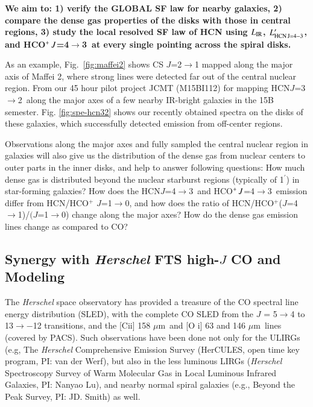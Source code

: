 \documentclass[legal,11pt]{article}
\def\arcmin {\hbox{$^{\prime}$}}
\def\,{\thinspace}
\def\to{$\rightarrow$}
\def\mum{$\mu$m}
\def\LIR     {$L_{\rm IR}$}
\def\LHCNft  {$L'_{\rm HCN\, J=4-3}$}
\def\HCNft        {HCN\,$J$=4$\rightarrow$3}
\def\HCNtt        {HCN\,$J$=3$\rightarrow$2}
\def\HCOPft     {HCO$^+\,J$=4$\rightarrow$3}
\begin{document}
{\bf We aim to: 1) verify the GLOBAL SF law for nearby galaxies, 2) compare the
dense gas properties of the disks with those in central regions, 3) study the
local resolved SF law of HCN using \LIR, \LHCNft, and \HCOPft\  at every single
pointing across the spiral disks.} 


As an example, Fig.~\ref{fig:maffei2} shows CS $J$=2$\rightarrow$1 mapped along
the major axis of Maffei 2, where strong lines were detected far out of the
central nuclear region. From our 45 hour pilot project JCMT (M15BI112) for
mapping \HCNtt\ along the major axes of a few nearby IR-bright galaxies in the
15B semester. Fig. \ref{fig:spe-hcn32} shows our recently obtained spectra on
the disks of these galaxies, which successfully detected emission from
off-center regions.  


Observations along the major axes and fully sampled the central nuclear region
in galaxies will also give us the distribution of the dense gas from nuclear
centers to outer parts in the inner disks, and help to answer following
questions: How much dense gas is distributed beyond the nuclear starburst
regions (typically of 1\arcmin) in star-forming galaxies?  How does the \HCNft\
and \HCOPft\ emission differ from HCN/HCO$^+$ $J$=1\to0, and how does the ratio
of HCN/HCO$^+$($J$=4\to 1)/$(J$=1\to 0) change along the major axes? How do the
dense gas emission lines change as compared to CO?


\subsection{Synergy with \textit{\textbf{Herschel}} FTS high-$J$ CO and Modeling}

The {\it Herschel} space observatory has provided a treasure of the CO spectral line
energy distribution (SLED),  with the complete CO SLED from the $J$ = 5\to4 to
13\to−12 transitions, and the [C{\sc ii}] 158 \mum\ and [O {\sc i}] 63 and 146
\mum\ lines (covered by PACS). Such observations have been done not only for
the ULIRGs (e.g, The {\it Herschel} Comprehensive Emission Survey (HerCULES,
open time key program, PI: van der Werf), but also in the less luminous LIRGs
({\it Herschel} Spectroscopy  Survey of Warm Molecular Gas in Local Luminous
Infrared Galaxies, PI: Nanyao Lu), and nearby normal spiral galaxies (e.g.,
Beyond the Peak Survey, PI: JD. Smith) as well.  
\end{document}
